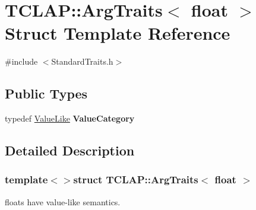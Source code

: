 \hypertarget{struct_t_c_l_a_p_1_1_arg_traits_3_01float_01_4}{\section{T\-C\-L\-A\-P\-:\-:Arg\-Traits$<$ float $>$ Struct Template Reference}
\label{struct_t_c_l_a_p_1_1_arg_traits_3_01float_01_4}
}


{\ttfamily \#include $<$Standard\-Traits.\-h$>$}

\subsection*{Public Types}
\begin{DoxyCompactItemize}
\item 
\hypertarget{struct_t_c_l_a_p_1_1_arg_traits_3_01float_01_4_ace983d74b1b28caa692840da15313acf}{typedef \hyperlink{struct_t_c_l_a_p_1_1_value_like}{Value\-Like} {\bfseries Value\-Category}}\label{struct_t_c_l_a_p_1_1_arg_traits_3_01float_01_4_ace983d74b1b28caa692840da15313acf}

\end{DoxyCompactItemize}


\subsection{Detailed Description}
\subsubsection*{template$<$$>$struct T\-C\-L\-A\-P\-::\-Arg\-Traits$<$ float $>$}

floats have value-\/like semantics. 